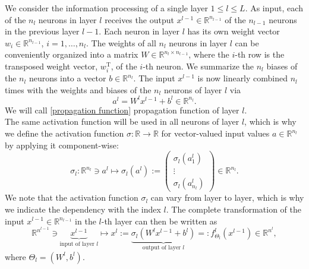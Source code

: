 We consider the information processing of a single layer $1 \leq l \leq L$. As input, each of the $n_l$ neurons in layer $l$ receives the output $x^{l-1} \in \mathbb{R}^{n_{l-1}}$ of the $n_{l-1}$ neurons in the previous layer $l-1$. Each neuron in layer $l$ has its own weight vector $w_i \in \mathbb{R}^{n_{l-1}}$, $i = 1, \ldots, n_l$. The weights of all $n_l$ neurons in layer $l$ can be conveniently organized into a matrix $W \in \mathbb{R}^{n_l \times n_{l-1}}$, where the $i$-th row is the transposed weight vector, $w^{\mathrm{T}}_i$, of the $i$-th neuron. We summarize the $n_l$ biases of the $n_l$ neurons into a vector $b \in \mathbb{R}^{n_l}$. The input $x^{l-1}$ is now linearly combined $n_l$ times with the weights and biases of the $n_l$ neurons of layer $l$ via 
\begin{equation}
    \label{propagation function}
    a^l = W^l x^{l-1} + b^l \in \mathbb{R}^{n_l}.
\end{equation}
We will call \cref{propagation function} propagation function of layer $l$. \\
The same activation function will be used in all neurons of layer $l$, which is why we define the activation function $\sigma \colon \mathbb{R} \to \mathbb{R}$ for vector-valued input values $a \in \mathbb{R}^{n_l}$ by applying it component-wise:
\begin{equation*}
    \sigma_l \colon \mathbb{R}^{n_l} \ni a^l \mapsto \sigma_l (a^l):= \left(
        \begin{array}
            {c} \sigma_l \left( a^l_{1} \right) \\
            \vdots \\
            \sigma_l \left( a^l_{n_l} \right)
        \end{array}
        \right) \in \mathbb{R}^{n_l}.
\end{equation*}
We note that the activation function $\sigma_l$ can vary from layer to layer, which is why we indicate the dependency with the index $l$. The complete transformation of the input $x^{l-1} \in \mathbb{R}^{n_{l-1}}$ in the $l$-th layer can then be written as
\begin{equation}
    \label{action layer}
    \mathbb{R}^{n^{l-1}} \ni \underbrace{x^{l-1}}_{\text{input of layer } l} \mapsto x^{l}:=\underbrace{\sigma_{l}\left( W^{l} x^{l-1} + b^{l} \right)}_{\text{output of layer } l}=: f^{l}_{\Theta_l} \left( x^{l-1} \right) \in \mathbb{R}^{n^{l}}, 
\end{equation}
where $\Theta_l = (W^{l}, b^{l})$. \\

